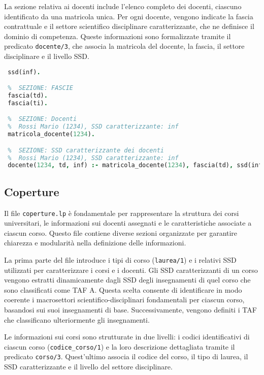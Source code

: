 La sezione relativa ai docenti include l'elenco completo dei docenti, ciascuno 
identificato da una matricola unica. Per ogni docente, vengono indicate la fascia 
contrattuale e il settore scientifico disciplinare caratterizzante, che ne 
definisce il dominio di competenza. Queste informazioni sono formalizzate tramite 
il predicato \texttt{docente/3}, che associa la matricola del docente, la fascia, 
il settore disciplinare e il livello SSD.

\begin{lstlisting}[language=prolog, caption={Esempio struttura dati di \texttt{docenti.lp}.}]    
 %  SEZIONE: SSD
 ssd(inf).

 %  SEZIONE: FASCIE
 fascia(td).
 fascia(ti).

 %  SEZIONE: Docenti
 %  Rossi Mario (1234), SSD caratterizzante: inf
 matricola_docente(1234).

 %  SEZIONE: SSD caratterizzante dei docenti
 %  Rossi Mario (1234), SSD caratterizzante: inf
 docente(1234, td, inf) :- matricola_docente(1234), fascia(td), ssd(inf).
\end{lstlisting}


\subsection{Coperture}\label{sec:rules-coperture}
Il file \texttt{coperture.lp} è fondamentale per rappresentare la struttura dei 
corsi universitari, le informazioni sui docenti assegnati e le caratteristiche 
associate a ciascun corso. Questo file contiene diverse sezioni organizzate per 
garantire chiarezza e modularità nella definizione delle informazioni.

La prima parte del file introduce i tipi di corso (\texttt{laurea/1}) e i relativi 
SSD utilizzati per caratterizzare i corsi e i docenti. Gli SSD caratterizzanti di 
un corso vengono estratti dinamicamente dagli SSD degli insegnamenti di quel corso 
che sono classificati come TAF A. Questa scelta consente di identificare in modo 
coerente i macrosettori scientifico-disciplinari fondamentali per ciascun corso, 
basandosi sui suoi insegnamenti di base. Successivamente, vengono definiti i TAF 
che classificano ulteriormente gli insegnamenti.

Le informazioni sui corsi sono strutturate in due livelli: i codici identificativi 
di ciascun corso (\texttt{codice\_corso/1}) e la loro descrizione dettagliata 
tramite il predicato \texttt{corso/3}. Quest'ultimo associa il codice del corso, 
il tipo di laurea, il SSD caratterizzante e il livello del settore disciplinare.

